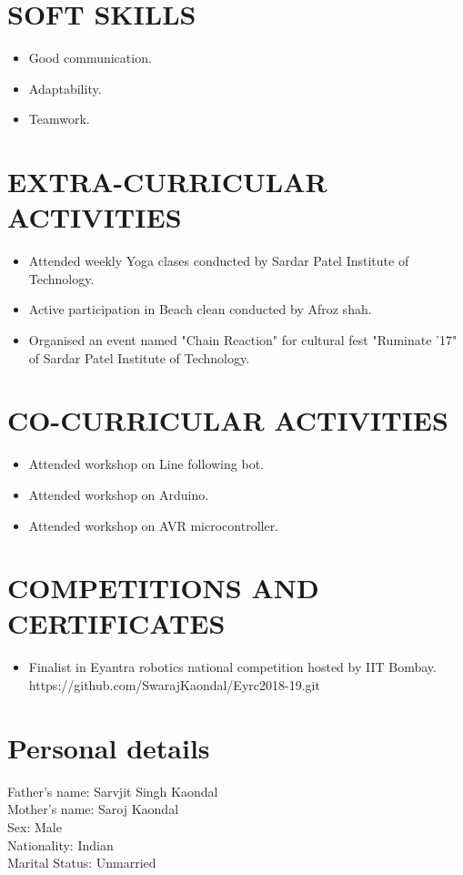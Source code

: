 \documentclass{article}
\begin{document}
\section*{\textbf{SOFT SKILLS}}
\begin{itemize}
\item Good communication.
\item Adaptability.
\item Teamwork.
\end{itemize}


\section*{\textbf{EXTRA-CURRICULAR ACTIVITIES}}
\begin{itemize}
\item Attended weekly Yoga clases conducted by Sardar Patel Institute of Technology. 
\item Active participation in Beach clean conducted by Afroz shah.
\item Organised an event named "Chain Reaction" for cultural fest "Ruminate '17" of Sardar Patel Institute of Technology.
\end{itemize}


\section*{\textbf{CO-CURRICULAR ACTIVITIES}}
\begin{itemize}
\item Attended workshop on Line following bot.
\item Attended workshop on Arduino.
\item Attended workshop on AVR microcontroller.
\end{itemize}

\section*{\textbf{COMPETITIONS AND CERTIFICATES}}
\begin{itemize}
\item Finalist in Eyantra robotics national competition hosted by IIT Bombay.\\https://github.com/SwarajKaondal/Eyrc2018-19.git
\end{itemize}


\section*{\textbf{Personal details}}
Father's name: Sarvjit Singh Kaondal\\
Mother's name: Saroj Kaondal\\
Sex: Male\\
Nationality: Indian\\
Marital Status: Unmarried
\end{document}
